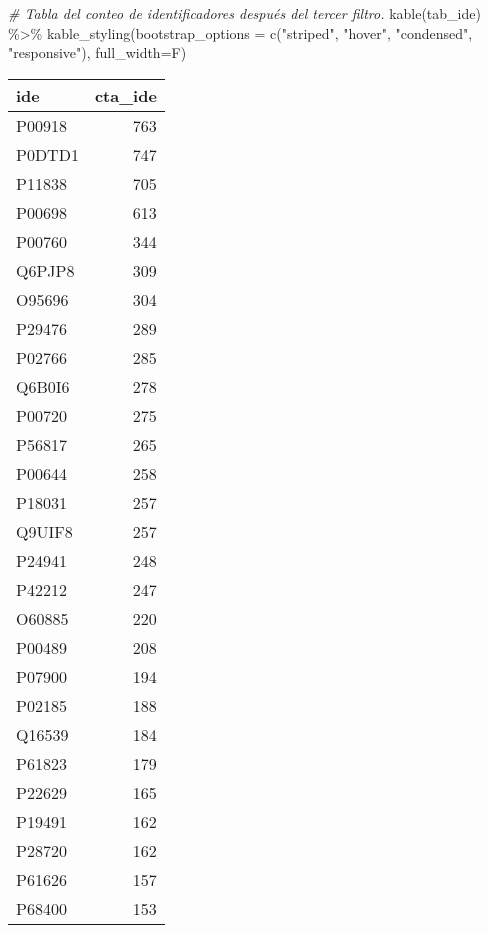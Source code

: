 \documentclass[
]{book}
\newenvironment{Shaded}{\begin{snugshade}}{\end{snugshade}}
\newcommand{\AttributeTok}[1]{\textcolor[rgb]{0.77,0.63,0.00}{#1}}
\newcommand{\CommentTok}[1]{\textcolor[rgb]{0.56,0.35,0.01}{\textit{#1}}}
\newcommand{\FunctionTok}[1]{\textcolor[rgb]{0.00,0.00,0.00}{#1}}
\newcommand{\NormalTok}[1]{#1}
\newcommand{\SpecialCharTok}[1]{\textcolor[rgb]{0.00,0.00,0.00}{#1}}
\newcommand{\StringTok}[1]{\textcolor[rgb]{0.31,0.60,0.02}{#1}}
\theoremstyle{definition}
\theoremstyle{definition}
\theoremstyle{definition}
\theoremstyle{definition}
\theoremstyle{remark}
\begin{document}
\begin{Shaded}
\begin{Highlighting}[]
\CommentTok{\# Tabla del conteo de identificadores después del tercer filtro.}
\FunctionTok{kable}\NormalTok{(tab\_ide) }\SpecialCharTok{\%\textgreater{}\%}
  \FunctionTok{kable\_styling}\NormalTok{(}\AttributeTok{bootstrap\_options =} \FunctionTok{c}\NormalTok{(}\StringTok{"striped"}\NormalTok{, }\StringTok{"hover"}\NormalTok{, }\StringTok{"condensed"}\NormalTok{, }\StringTok{"responsive"}\NormalTok{), }\AttributeTok{full\_width=}\NormalTok{F)}
\end{Highlighting}
\end{Shaded}

\begin{table}
\centering
\begin{tabular}{l|r}
\hline
ide & cta\_ide\\
\hline
P00918 & 763\\
\hline
P0DTD1 & 747\\
\hline
P11838 & 705\\
\hline
P00698 & 613\\
\hline
P00760 & 344\\
\hline
Q6PJP8 & 309\\
\hline
O95696 & 304\\
\hline
P29476 & 289\\
\hline
P02766 & 285\\
\hline
Q6B0I6 & 278\\
\hline
P00720 & 275\\
\hline
P56817 & 265\\
\hline
P00644 & 258\\
\hline
P18031 & 257\\
\hline
Q9UIF8 & 257\\
\hline
P24941 & 248\\
\hline
P42212 & 247\\
\hline
O60885 & 220\\
\hline
P00489 & 208\\
\hline
P07900 & 194\\
\hline
P02185 & 188\\
\hline
Q16539 & 184\\
\hline
P61823 & 179\\
\hline
P22629 & 165\\
\hline
P19491 & 162\\
\hline
P28720 & 162\\
\hline
P61626 & 157\\
\hline
P68400 & 153\\

\end{tabular}
\end{table}
\end{document}
